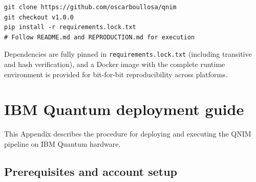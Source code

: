 \documentclass[11pt,a4paper, english]{book}
\theoremstyle{plain}
\theoremstyle{definition}
\numberwithin{equation}{chapter}
\numberwithin{figure}{chapter}
\numberwithin{table}{chapter}
\begin{document}
\begin{verbatim}
git clone https://github.com/oscarboullosa/qnim
git checkout v1.0.0
pip install -r requirements.lock.txt
# Follow README.md and REPRODUCTION.md for execution
\end{verbatim}

Dependencies are fully pinned in \texttt{requirements.lock.txt} (including
transitive and hash verification), and a Docker image with the complete
runtime environment is provided for bit-for-bit reproducibility across
platforms.

\chapter{IBM Quantum deployment guide}
\label{app:ibm-guide}

This Appendix describes the procedure for deploying and executing the
QNIM pipeline on IBM Quantum hardware.

\section{Prerequisites and account setup}
\label{app:ibm-prerequisites}
\end{document}
